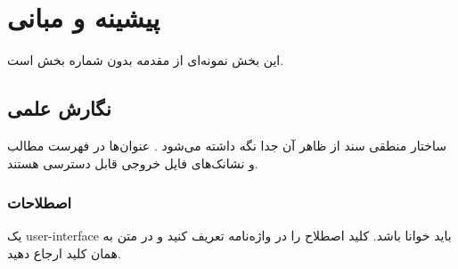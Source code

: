 \chapter{پیشینه و مبانی}
این بخش نمونه‌ای از مقدمه بدون شماره بخش است.
\section{نگارش علمی}
ساختار منطقی سند از ظاهر آن جدا نگه داشته می‌شود \cite{knuth1984,lamport1994}. عنوان‌ها در فهرست مطالب و نشانک‌های فایل خروجی قابل دسترسی هستند.
\subsection{اصطلاحات}
یک \gls{user-interface} باید خوانا باشد. کلید اصطلاح را در واژه‌نامه تعریف کنید و در متن به همان کلید ارجاع دهید.
